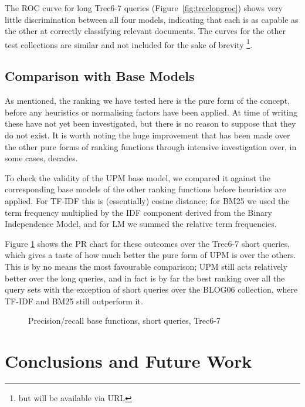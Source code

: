 The ROC curve for long Trec6-7 queries (Figure~\ref{fig:treclongroc}) shows very little discrimination between all four models, indicating that each is as capable as the other at correctly classifying relevant documents. The curves for the other test collections are similar and not included for the sake of brevity%
\footnote{but will be available via URL}.

\subsection{Comparison with Base Models}

As mentioned, the ranking we have tested here is the pure form of the concept, before any heuristics or normalising factors have been applied. At time of writing these have not yet been investigated, but there is no reason to suppose that they do not exist. It is worth noting the huge improvement that has been made over the other pure forms of ranking functions through intensive investigation over, in some cases, decades. 

To check the validity of the UPM base model, we compared it against the corresponding base models of the other ranking functions before heuristics are applied. For TF-IDF this is (essentially) cosine distance; for BM25 we used the term frequency multiplied by the IDF component derived from the Binary Independence Model, and for LM we summed the relative term frequencies.

Figure \ref{fig:trecshortbase} shows the PR chart for these outcomes over the Trec6-7 short queries, which gives a taste of how much better the pure form of UPM is over the others. This is by no means the most favourable comparison; UPM still acts relatively better over the long queries, and in fact is by far the best ranking over all the query sets with the exception of short queries over the BLOG06 collection, where TF-IDF and BM25 still outperform it.

\begin{figure}[h]
\centering
\caption{Precision/recall base functions, short queries, Trec6-7}
\label{fig:trecshortbase}
\end{figure}


\section{Conclusions and Future Work}

